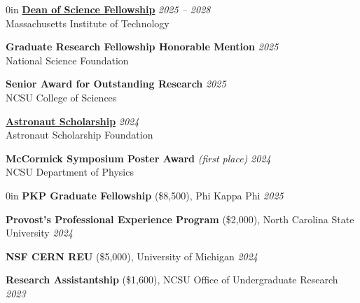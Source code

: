 \documentclass{cv}
\begin{document}
\begin{adjustwidth}{\spacing}{0in}
    \href{https://science.mit.edu/about/awards/deans-fellowship-program/}
    {\textbf{Dean of Science Fellowship}}
    \hfill{\textsl{2025 -- 2028}}\\
    \tabto{\spacing} Massachusetts Institute of Technology
    \vspace{0.3em}

    \textbf{Graduate Research Fellowship Honorable Mention}
    \hfill{\textsl{2025}}\\
    \tabto{\spacing} National Science Foundation
    \vspace{0.3em}

    \textbf{Senior Award for Outstanding Research}
    \hfill{\textsl{2025}}\\
    \tabto{\spacing} NCSU College of Sciences
    \vspace{0.3em}

    \href{https://www.astronautscholarship.org/programs/astronaut-scholarship/}
    {\textbf{Astronaut Scholarship}}
    \hfill{\textsl{2024}}\\
    \tabto{\spacing} Astronaut Scholarship Foundation
    \vspace{0.3em}

    \textbf{McCormick Symposium Poster Award}
    \textit{(first place)}
    \hfill{\textsl{2024}}\\
    \tabto{\spacing} NCSU Department of Physics
\end{adjustwidth}
\vspace{0.6em}

{}

\begin{adjustwidth}{\spacing}{0in}
    \textbf{PKP Graduate Fellowship} (\$8,500),
    Phi Kappa Phi
    \hfill \textsl{2025}

    \textbf{Provost's Professional Experience Program} (\$2,000),
    North Carolina State University
    \hfill \textsl{2024}

    \textbf{NSF CERN REU} (\$5,000),
    University of Michigan
    \hfill \textsl{2024}

    \textbf{Research Assistantship} (\$1,600),
    NCSU Office of Undergraduate Research
    \hfill \textsl{2023}
\end{adjustwidth}
\vspace{0.6em}


\vspace{0.2em}

\vspace{0.6em}
\end{document}
